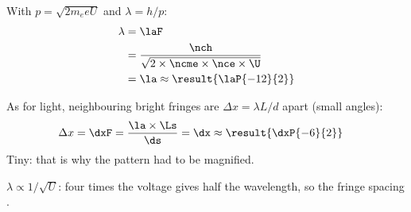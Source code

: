 \begin{abcliste}
\abc With $p = \sqrt{2 m_e e U}$ and $\lambda = h/p$:
\begin{align}
 \lambda &= \laF \\
   &= \frac{\nch}{\sqrt{2\times\ncme\times\nce\times\U}} \\
   &= \la \approx \result{\laP{-12}{2}}
\end{align}

\abc As for light, neighbouring bright fringes are $\Delta x = \lambda L/d$ apart (small angles):
\begin{align}
 \Delta x &= \dxF = \frac{\la\times\Ls}{\ds} = \dx \approx \result{\dxP{-6}{2}}
\end{align}
Tiny: that is why the pattern had to be magnified.

\abc $\lambda \propto 1/\sqrt{U}$: four times the voltage gives half the wavelength, so the fringe spacing .
\end{abcliste}
